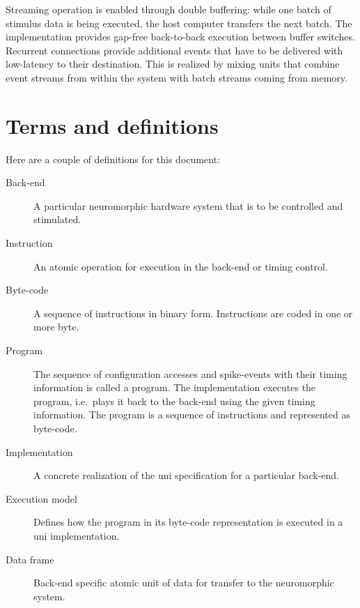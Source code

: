 Streaming operation is enabled through double buffering: while one batch of stimulus data is being executed, the host computer transfers the next batch.
The implementation provides gap-free back-to-back execution between buffer switches.
Recurrent connections provide additional events that have to be delivered with low-latency to their destination.
This is realized by mixing units that combine event streams from within the system with batch streams coming from memory.


\section{Terms and definitions}

Here are a couple of definitions for this document:

\begin{description}
    \item[Back-end]
        A particular neuromorphic hardware system that is to be controlled and stimulated.

    \item[Instruction]
        An atomic operation for execution in the back-end or timing control.

    \item[Byte-code]
        A sequence of instructions in binary form.
        Instructions are coded in one or more byte.

    \item[Program]
        The sequence of configuration accesses and spike-events with their timing information is called a program.
        The implementation executes the program, i.e.\ plays it back to the back-end using the given timing information.
        The program is a sequence of instructions and represented as byte-code.

    \item[Implementation]
        A concrete realization of the \gls{uni} specification for a particular back-end.

    \item[Execution model]
        Defines how the program in its byte-code representation is executed in a \gls{uni} implementation.

    \item[Data frame]
        Back-end specific atomic unit of data for transfer to the neuromorphic system.
\end{description}


